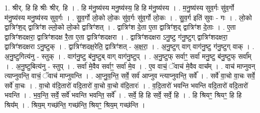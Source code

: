 \documentclass[17pt]{extarticle}
\begin{document}
1. श्रीर्. हि हि श्रीः श्रीर्. हि । . हि म॑नु॒ष्य॑स्य मनु॒ष्य॑स्य॒ हि हि म॑नु॒ष्य॑स्य । . म॒नु॒ष्य॑स्य सुव॒र्गः सु॑व॒र्गो म॑नु॒ष्य॑स्य मनु॒ष्य॑स्य सुव॒र्गः । . सु॒व॒र्गो लो॒को लो॒कः सु॑व॒र्गः सु॑व॒र्गो लो॒कः । . सु॒व॒र्ग इति॑ सुवः - गः । . लो॒को द्वात्रिꣳ॑श॒द् द्वात्रिꣳ॑श ल्लो॒को लो॒को द्वात्रिꣳ॑शत् । . द्वात्रिꣳ॑श दे॒ता ए॒ता द्वात्रिꣳ॑श॒द् द्वात्रिꣳ॑श दे॒ताः । . ए॒ता द्वात्रिꣳ॑शदक्षरा॒ द्वात्रिꣳ॑शदक्ष रै॒ता ए॒ता द्वात्रिꣳ॑शदक्षरा । . द्वात्रिꣳ॑शदक्षरा ऽनु॒ष्टु ग॑नु॒ष्टुग् द्वात्रिꣳ॑शदक्षरा॒ द्वात्रिꣳ॑शदक्षरा ऽनु॒ष्टुक् । . द्वात्रिꣳ॑शदक्ष॒रेति॒ द्वात्रिꣳ॑शत् - अ॒क्ष॒रा॒ । . अ॒नु॒ष्टुग् वाग् वाग॑नु॒ष्टु ग॑नु॒ष्टुग् वाक् । . अ॒नु॒ष्टुगित्य॑नु - स्तुक् । . वाग॑नु॒ष्टु ब॑नु॒ष्टुब् वाग् वाग॑नु॒ष्टुप् । . अ॒नु॒ष्टुफ् सर्वाꣳ॒॒ सर्वा॑ मनु॒ष्टु ब॑नु॒ष्टुफ् सर्वा᳚म् । . अ॒नु॒ष्टुबित्य॑नु - स्तुप् । . सर्वा॑ मे॒वैव सर्वाꣳ॒॒ सर्वा॑ मे॒व । . ए॒व वाचं॒ ॅवाच॑ मे॒वैव वाच᳚म् । . वाच॑ माप्नुवन् त्याप्नुवन्ति॒ वाचं॒ ॅवाच॑ माप्नुवन्ति । . आ॒प्नु॒व॒न्ति॒ सर्वे॒ सर्व॑ आप्नुव न्त्याप्नुवन्ति॒ सर्वे᳚ । . सर्वे॑ वा॒चो वा॒चः सर्वे॒ सर्वे॑ वा॒चः । . वा॒चो व॑दि॒तारो॑ वदि॒तारो॑ वा॒चो वा॒चो व॑दि॒तारः॑ । . व॒दि॒तारो॑ भवन्ति भवन्ति वदि॒तारो॑ वदि॒तारो॑ भवन्ति । . भ॒व॒न्ति॒ सर्वे॒ सर्वे॑ भवन्ति भवन्ति॒ सर्वे᳚ । . सर्वे॒ हि हि सर्वे॒ सर्वे॒ हि । . हि श्रियꣳ॒॒ श्रियꣳ॒॒ हि हि श्रिय᳚म् । . श्रिय॒म् गच्छ॑न्ति॒ गच्छ॑न्ति॒ श्रियꣳ॒॒ श्रिय॒म् गच्छ॑न्ति । \newline
\end{document}
